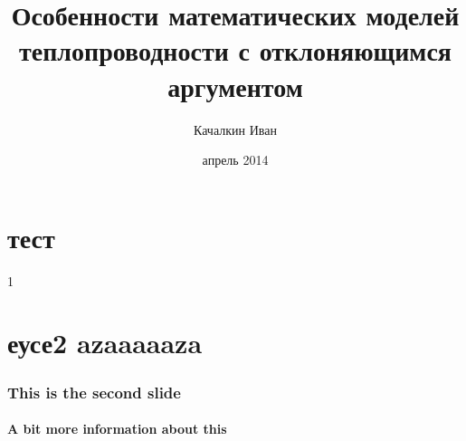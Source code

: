 \documentclass{beamer}
\begin{document}
    \title{Особенности математических моделей теплопроводности с отклоняющимся аргументом}
    \author{Качалкин Иван}
    \date{апрель 2014}

    {
        \frame{\titlepage}
    }

    \section{тест}
    \begin{frame}
    1
    \end{frame}

    \section{еусе2 azaaaaaza}
    \begin{frame}
    \frametitle{This is the second slide}
    \framesubtitle{A bit more information about this}
    \end{frame}
\end{document}
